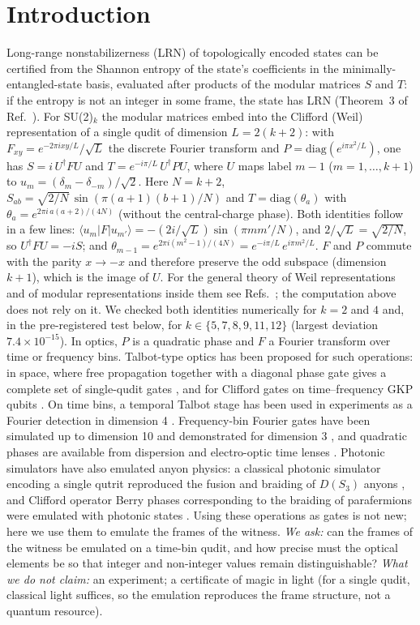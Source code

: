 \documentclass[aps,pra,reprint,superscriptaddress,nofootinbib]{revtex4-2}
\begin{document}
\section{Introduction}
Long-range nonstabilizerness (LRN) of topologically encoded states can be certified from the Shannon entropy of the state's coefficients in the minimally-entangled-state basis, evaluated after products of the modular matrices $S$ and $T$: if the entropy is not an integer in some frame, the state has LRN (Theorem~3 of Ref.~\cite{Korbany2026MI}).
For SU(2)$_k$ the modular matrices embed into the Clifford (Weil) representation of a single qudit of dimension $L=2(k+2)$: with $F_{xy}=e^{-2\pi ixy/L}/\sqrt L$ the discrete Fourier transform and $P=\mathrm{diag}(e^{i\pi x^2/L})$, one has $S=i\,U^\dagger FU$ and $T=e^{-i\pi/L}\,U^\dagger PU$, where $U$ maps label $m-1$ ($m=1,\dots,k+1$) to $u_m=(\delta_m-\delta_{-m})/\sqrt2$. Here $N=k+2$, $S_{ab}=\sqrt{2/N}\,\sin(\pi(a+1)(b+1)/N)$ and $T=\mathrm{diag}(\theta_a)$ with $\theta_a=e^{2\pi i\,a(a+2)/(4N)}$ (without the central-charge phase). Both identities follow in a few lines: $\langle u_m|F|u_{m'}\rangle=-(2i/\sqrt L)\sin(\pi mm'/N)$, and $2/\sqrt L=\sqrt{2/N}$, so $U^\dagger FU=-iS$; and $\theta_{m-1}=e^{2\pi i(m^2-1)/(4N)}=e^{-i\pi/L}\,e^{i\pi m^2/L}$. $F$ and $P$ commute with the parity $x\to-x$ and therefore preserve the odd subspace (dimension $k+1$), which is the image of $U$. For the general theory of Weil representations and of modular representations inside them see Refs.~\cite{EholzerSkoruppa1995,Cheng2024}; the computation above does not rely on it. We checked both identities numerically for $k=2$ and $4$ and, in the pre-registered test below, for $k\in\{5,7,8,9,11,12\}$ (largest deviation $7.4\times10^{-15}$).
In optics, $P$ is a quadratic phase and $F$ a Fourier transform over time or frequency bins.
Talbot-type optics has been proposed for such operations: in space, where free propagation together with a diagonal phase gate gives a complete set of single-qudit gates \cite{Farias2015}, and for Clifford gates on time--frequency GKP qubits \cite{Pousset2026}. On time bins, a temporal Talbot stage has been used in experiments as a Fourier detection in dimension 4 \cite{Widomski2024,Ogrodnik2025}.
Frequency-bin Fourier gates have been simulated up to dimension 10 and demonstrated for dimension 3 \cite{Lu2022}, and quadratic phases are available from dispersion and electro-optic time lenses \cite{LipkaParniak2023}.
Photonic simulators have also emulated anyon physics: a classical photonic simulator encoding a single qutrit reproduced the fusion and braiding of $D(S_3)$ anyons \cite{Goel2024}, and Clifford operator Berry phases corresponding to the braiding of parafermions were emulated with photonic states \cite{Liu2021}.
Using these operations as gates is not new; here we use them to emulate the frames of the witness.
\emph{We ask:} can the frames of the witness be emulated on a time-bin qudit, and how precise must the optical elements be so that integer and non-integer values remain distinguishable?
\emph{What we do not claim:} an experiment; a certificate of magic in light (for a single qudit, classical light suffices, so the emulation reproduces the frame structure, not a quantum resource).
\end{document}
